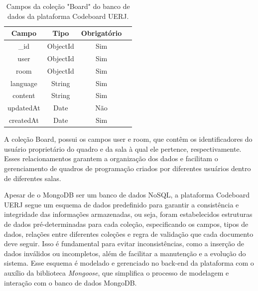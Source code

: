 \begin{table}[H]
    \centering
    \caption{Campos da coleção "Board" do banco de dados da plataforma Codeboard UERJ.}
    \label{tab:board-collection-fields}
    \renewcommand{\arraystretch}{1.3} 
    \begin{tabular}{|c|c|c|c|}
        \hline
        \textbf{Campo}             & \textbf{Tipo} & \textbf{Obrigatório} \\
        \hline
        \_id             & ObjectId      & Sim                  \\
        \hline
        user          & ObjectId      & Sim                  \\
        \hline
        room          & ObjectId      & Sim                  \\
        \hline
        language           & String        & Sim                  \\
        \hline
        content                 & String        & Sim                  \\
        \hline
        updatedAt         & Date          & Não                  \\
        \hline
        createdAt          & Date          & Sim                  \\
        \hline
    \end{tabular}
\end{table}

A coleção Board, possui os campos user e room, que contêm os identificadores do usuário proprietário do quadro e da sala à qual ele pertence, respectivamente. Esses relacionamentos garantem a organização dos dados e facilitam o gerenciamento de quadros de programação criados por diferentes usuários dentro de diferentes salas.

Apesar de o MongoDB ser um banco de dados NoSQL, a plataforma Codeboard UERJ segue um esquema de dados predefinido para garantir a consistência e integridade das informações armazenadas, ou seja, foram estabelecidos estruturas de dados pré-determinadas para cada coleção, especificando os campos, tipos de dados, relações entre diferentes coleções e regra de validação que cada documento deve seguir. Isso é fundamental para evitar inconsistências, como a inserção de dados inválidos ou incompletos, além de facilitar a manutenção e a evolução do sistema. Esse esquema é modelado e gerenciado no back-end da plataforma com o auxílio da biblioteca \emph{Mongoose}, que simplifica o processo de modelagem e interação com o banco de dados MongoDB.


